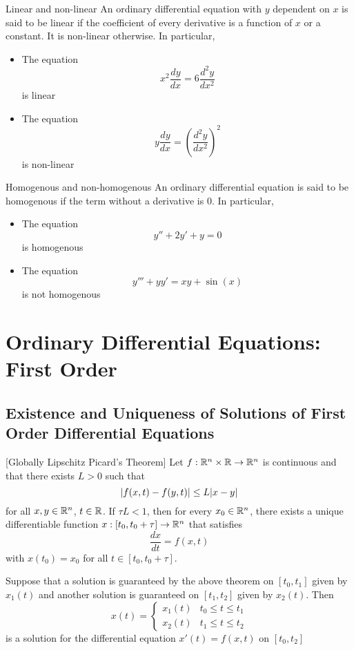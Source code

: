 \documentclass[a4paper]{article}
\begin{document}
\begin{defn}{Linear and non-linear}{} An ordinary differential equation with $y$ dependent on $x$ is said to be linear if the coefficient of every derivative is a function of $x$ or a constant. It is non-linear otherwise. In particular,
\begin{itemize}
\item The equation $$x^2\frac{dy}{dx}=6\frac{d^2y}{dx^2}$$ is linear
\item The equation $$y\frac{dy}{dx}=\left(\frac{d^2y}{dx^2}\right)^2$$ is non-linear
\end{itemize}
\end{defn}

\begin{defn}{Homogenous and non-homogenous}{} An ordinary differential equation is said to be homogenous if the term without a derivative is $0$. In particular,
\begin{itemize}
\item The equation $$y''+2y'+y=0$$ is homogenous
\item The equation $$y'''+yy'=xy+\sin(x)$$ is not homogenous
\end{itemize}
\end{defn}

\pagebreak
\section{Ordinary Differential Equations: First Order}
\subsection{Existence and Uniqueness of Solutions of First Order Differential Equations}
\begin{thm}{}{}[Globally Lipschitz Picard's Theorem] Let $f:\mathbb{R}^n\times\mathbb{R}\to\mathbb{R}^n$ is continuous and that there exists $L>0$ such that $$\abs{f(x,t)-f(y,t)}\leq L\abs{x-y}$$ for all $x,y\in\mathbb{R}^n$, $t\in\mathbb{R}$.  If $\tau L<1$, then for every $x_0\in\mathbb{R}^n$, there exists a unique differentiable function $x:[t_0,t_0+\tau]\to\mathbb{R}^n$ that satisfies $$\frac{dx}{dt}=f(x,t)$$ with $x(t_0)=x_0$ for all $t\in[t_0,t_0+\tau]$. 
\end{thm}

\begin{prp}{}{} Suppose that a solution is guaranteed by the above theorem on $[t_0,t_1]$ given by $x_1(t)$ and another solution is guaranteed on $[t_1,t_2]$ given by $x_2(t)$. Then $$x(t)=\begin{cases}
x_1(t) & t_0\leq t\leq t_1\\
x_2(t) & t_1\leq t\leq t_2
\end{cases}$$ is a solution for the differential equation $x'(t)=f(x,t)$ on $[t_0,t_2]$
\end{prp}
\end{document}
